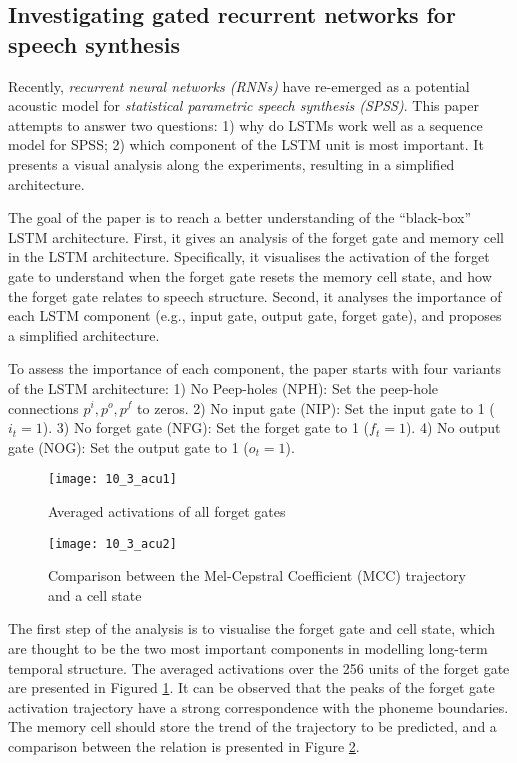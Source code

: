 \subsection{Investigating gated recurrent networks for speech synthesis \cite{Wu2016Investigating}}

Recently, \emph{recurrent neural networks (RNNs)} have re-emerged as a potential acoustic model for \emph{statistical parametric speech synthesis (SPSS)}. This paper attempts to answer two questions: 1) why do LSTMs work well as a sequence model for SPSS; 2) which component of the LSTM unit is most important. It presents a visual analysis along the experiments, resulting in a simplified architecture.

The goal of the paper is to reach a better understanding of the ``black-box'' LSTM architecture. First, it gives an analysis of the forget gate and memory cell in the LSTM architecture. Specifically, it visualises the activation of the forget gate to understand when the forget gate resets the memory cell state, and how the forget gate relates to speech structure. Second, it analyses the importance of each LSTM component (e.g., input gate, output gate, forget gate), and proposes a simplified architecture.

To assess the importance of each component, the paper starts with four variants of the LSTM architecture: 1) No Peep-holes (NPH): Set the peep-hole connections $p^i, p^o, p^f$ to zeros. 2) No input gate (NIP): Set the input gate to 1 ($i_t = 1$). 3) No forget gate (NFG): Set the forget gate to 1 ($f_t = 1$). 4) No output gate (NOG):  Set the output gate to 1 ($o_t = 1$).

\begin{figure}[htbp]
  \centering
  \texttt{[image: 10\_3\_acu1]}\\
  \caption{Averaged activations of all forget gates}\label{fig:acu1}
\end{figure}

\begin{figure}[htbp]
  \centering
  \texttt{[image: 10\_3\_acu2]}\\
  \caption{Comparison between the Mel-Cepstral Coefficient (MCC) trajectory and a cell state}\label{fig:acu2}
\end{figure}

The first step of the analysis is to visualise the forget gate and cell state, which are thought to be the two most important components in modelling long-term temporal structure. The averaged activations over the 256 units of the forget gate are presented in Figured \ref{fig:acu1}. It can be observed that the peaks of the forget gate activation trajectory have a strong correspondence with the phoneme boundaries. The memory cell should store the trend of the trajectory to be predicted, and a comparison between the relation is presented in Figure \ref{fig:acu2}.

